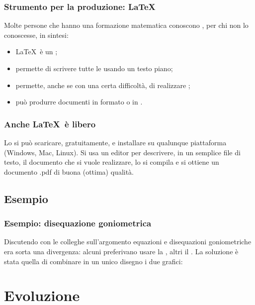 \documentclass{beamer} %
\begin{document}
\begin{frame}\frametitle{Strumento per la produzione: \LaTeX}

Molte persone che hanno una formazione matematica conoscono 
\orange{\LaTeX}, per chi non lo conoscesse, in sintesi:
\begin{itemize} %
\item \LaTeX\ è un ; 
\item permette di scrivere tutte le  usando un testo piano;
\item permette, anche se con una certa difficoltà, di realizzare 
;
\item può produrre documenti in formato  o 
in .
\end{itemize}

\end{frame}


\begin{frame}\frametitle{Anche \LaTeX\ è libero}

Lo si può scaricare, gratuitamente, e installare 
su qualunque piattaforma (Windows, Mac, Linux).
\spause
Si usa un editor per descrivere, in un semplice file di testo, 
il documento che si vuole realizzare, lo si compila e si ottiene un 
documento .pdf di buona (ottima) qualità.

\end{frame}


\subsection{Esempio} 

\begin{frame}\frametitle{Esempio: disequazione goniometrica}

Discutendo con le colleghe sull'argomento equazioni e 
disequazioni goniometriche era sorta una divergenza: alcuni preferivano 
usare la , 
altri il .
\spause
La soluzione è stata quella di combinare in un unico disegno i due grafici: 

\begin{center}
\disequazionegon
\end{center}

\end{frame}


\section{Evoluzione}
\end{document}
